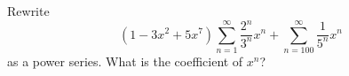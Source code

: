 Rewrite 
\[
(1 - 3x^2 + 5x^7) \sum_{n = 1}^\infty \frac{2^n}{3^n}x^n
+ \sum_{n=100}^\infty \frac{1}{5^n}x^n 
\]
as a
power series.
What is the coefficient of $x^n$?

